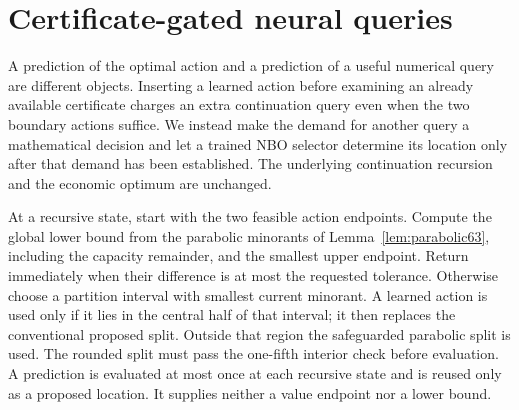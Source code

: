 \section{Certificate-gated neural queries}\label{sec:gated64}
A prediction of the optimal action and a prediction of a useful numerical query are different objects. Inserting a learned action before examining an already available certificate charges an extra continuation query even when the two boundary actions suffice. We instead make the demand for another query a mathematical decision and let a trained NBO selector determine its location only after that demand has been established. The underlying continuation recursion and the economic optimum are unchanged.

At a recursive state, start with the two feasible action endpoints. Compute the global lower bound from the parabolic minorants of Lemma~\ref{lem:parabolic63}, including the capacity remainder, and the smallest upper endpoint. Return immediately when their difference is at most the requested tolerance. Otherwise choose a partition interval with smallest current minorant. A learned action is used only if it lies in the central half of that interval; it then replaces the conventional proposed split. Outside that region the safeguarded parabolic split is used. The rounded split must pass the one-fifth interior check before evaluation. A prediction is evaluated at most once at each recursive state and is reused only as a proposed location. It supplies neither a value endpoint nor a lower bound.

